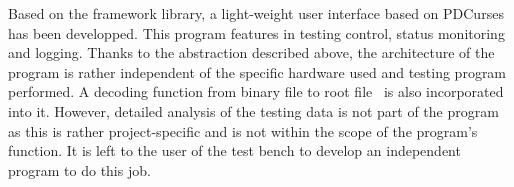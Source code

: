 \documentclass[5p, times]{elsarticle}
\begin{document}
Based on the framework library, a light-weight user interface based on PDCurses~\cite{pdcurses} has been developped.
This program features in testing control, status monitoring and logging.
Thanks to the abstraction described above, the architecture of the program is rather independent of the specific hardware used and testing program performed.
A decoding function from binary file to root file~\cite{root} is also incorporated into it.
However, detailed analysis of the testing data is not part of the program as this is rather project-specific and is not within the scope of the program's function.
It is left to the user of the test bench to develop an independent program to do this job.

\end{document}
